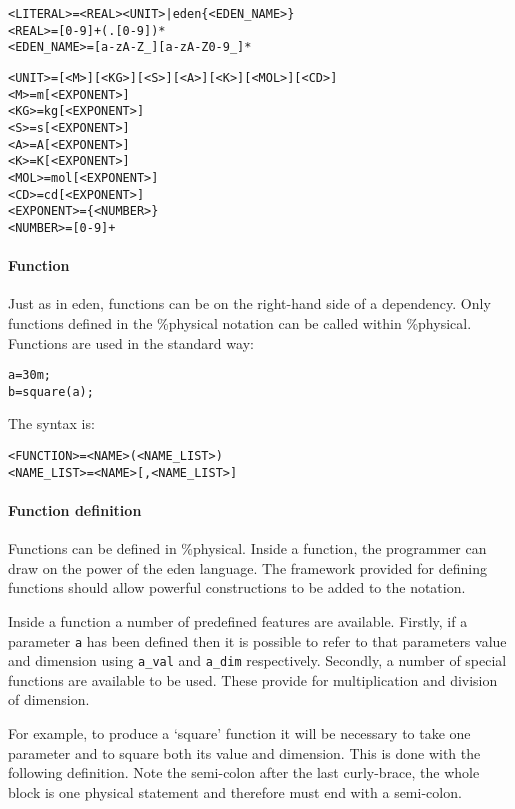 \documentclass[a4paper]{article}
\begin{document}
{{{
\begin{alltt}
<LITERAL>   = <REAL> <UNIT> | eden\{<EDEN_NAME>\}
<REAL>      = [0-9]+(.[0-9])*
<EDEN_NAME> = [a-zA-Z_\-][a-zA-Z0-9_\-]* 

<UNIT>      = [<M>][<KG>][<S>][<A>][<K>][<MOL>][<CD>]
<M>         = m   [<EXPONENT>]
<KG>        = kg  [<EXPONENT>]
<S>         = s   [<EXPONENT>]
<A>         = A   [<EXPONENT>]
<K>         = K   [<EXPONENT>]
<MOL>       = mol [<EXPONENT>]
<CD>        = cd  [<EXPONENT>]
<EXPONENT>  = \{ <NUMBER> \}
<NUMBER>    = [0-9]+
\end{alltt}
}}}

\paragraph{Function}
Just as in eden, functions can be on the right-hand side of a dependency.
Only functions defined in the \%physical notation 
can be called within \%physical.
Functions are used in the standard way:

\begin{alltt}
%physical
a = 30 m;
b = square(a);
\end{alltt}

The syntax is:
\begin{alltt}
<FUNCTION>  = <NAME> ( <NAME_LIST> )
<NAME_LIST> = <NAME> [, <NAME_LIST>]
\end{alltt}

\paragraph{Function definition}
Functions can be defined in \%physical. Inside a function, the programmer can
draw on the power of the eden language. The framework provided for defining
functions should allow powerful constructions to be added to the notation.

Inside a function a number of predefined features are available. Firstly, if a
parameter \texttt{a} has been defined then it is possible to refer to 
that parameters value and dimension using \texttt{a\_val} and 
\texttt{a\_dim} respectively. Secondly, a number of special functions are 
available to be used. These provide for multiplication and division of 
dimension.




For example, to produce a `square' function it will be necessary to take one
parameter and to square both its value and dimension. This is done with the 
following definition. Note the semi-colon after the last curly-brace, the whole 
block is one physical statement and therefore must end with a semi-colon.
\end{document}
